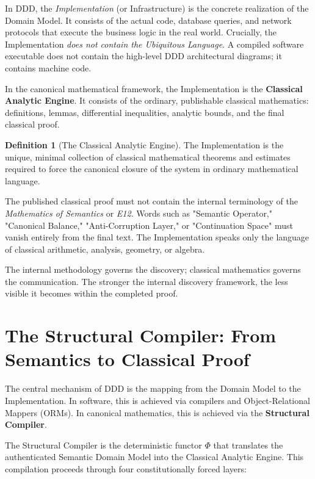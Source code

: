 \documentclass[12pt,openany]{extbook}
\theoremstyle{plain}
\theoremstyle{definition}
\newtheorem{definition}{Definition}[chapter]
\begin{document}
In DDD, the \emph{Implementation} (or Infrastructure) is the concrete realization of the Domain Model. It consists of the actual code, database queries, and network protocols that execute the business logic in the real world. Crucially, the Implementation \emph{does not contain the Ubiquitous Language}. A compiled software executable does not contain the high-level DDD architectural diagrams; it contains machine code.

In the canonical mathematical framework, the Implementation is the \textbf{Classical Analytic Engine}. It consists of the ordinary, publishable classical mathematics: definitions, lemmas, differential inequalities, analytic bounds, and the final classical proof.

\begin{definition}[The Classical Analytic Engine]
The Implementation is the unique, minimal collection of classical mathematical theorems and estimates required to force the canonical closure of the system in ordinary mathematical language.
\end{definition}

The published classical proof must not contain the internal terminology of the \emph{Mathematics of Semantics} or \emph{E12}. Words such as "Semantic Operator," "Canonical Balance," "Anti-Corruption Layer," or "Continuation Space" must vanish entirely from the final text. The Implementation speaks only the language of classical arithmetic, analysis, geometry, or algebra. 

The internal methodology governs the discovery; classical mathematics governs the communication. The stronger the internal discovery framework, the less visible it becomes within the completed proof.

\section{The Structural Compiler: From Semantics to Classical Proof}

The central mechanism of DDD is the mapping from the Domain Model to the Implementation. In software, this is achieved via compilers and Object-Relational Mappers (ORMs). In canonical mathematics, this is achieved via the \textbf{Structural Compiler}.

The Structural Compiler is the deterministic functor $\Phi$ that translates the authenticated Semantic Domain Model into the Classical Analytic Engine. This compilation proceeds through four constitutionally forced layers:
\end{document}
